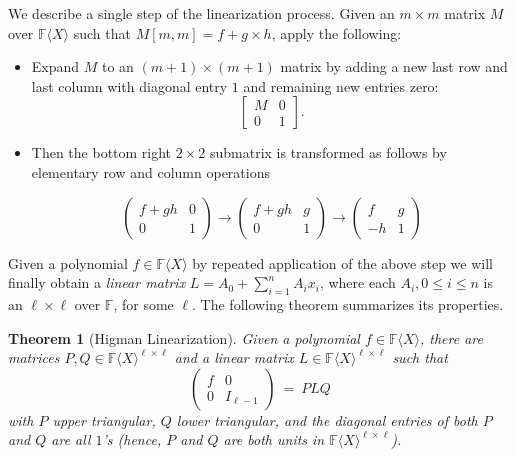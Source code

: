 \documentclass[10pt,a4paper]{article}
\newtheorem{theorem}{Theorem}[section]
\newcommand{\F}{\mathbb{F}}
\renewcommand{\angle}[1]{\langle #1 \rangle}
\newcommand{\FX}{\F\angle{X}}
\newcommand{\fR}{\FX}
\begin{document}
We describe a single step of the linearization process. Given an
$m \times m$ matrix $M$ over $\fR$ such that $M[m,m]=f+g\times h$,
apply the following:
\begin{itemize}
\item Expand $M$ to an  $(m+1)\times (m+1)$ matrix by adding a new last
  row and last column with diagonal entry $1$ and remaining new entries
  zero:
\[
\left[
\begin{array}{c|c}
M & 0 \\
\hline
0 & 1
\end{array}
\right]. 
\]
\item Then the bottom right $2\times 2$ submatrix is transformed as
  follows by elementary row and column operations

\[
\left(
\begin{array}{cc}
f+gh & 0 \\
0 & 1
\end{array}
\right)\rightarrow
\left(
\begin{array}{cc}
f+gh & g \\
0 & 1
\end{array}
\right)\rightarrow
\left(
\begin{array}{cc}
f & g \\
-h & 1
\end{array}
\right)
\]

\end{itemize}

Given a polynomial $f\in\FX$ by repeated application of the above step
we will finally obtain a \emph{linear matrix} $L=A_0+\sum_{i=1}^n A_i
x_i$, where each $A_i, 0\le i\le n$ is an $\ell\times \ell$ over $\F$,
for some $\ell$. The following theorem summarizes its properties.

\begin{theorem}[Higman Linearization]{\rm\cite{Cohnfir}}\label{higthm}
  Given a polynomial $f\in\fR$, there are matrices $P, Q\in\fR^{\ell \times \ell}$
  and a linear matrix $L\in\fR^{\ell\times \ell}$ such that
\begin{equation}\label{higeq}
%
\left(
\begin{array}{c|c}
f & 0 \\
\hline
0 & I_{\ell-1}
\end{array}
\right) ~=~PLQ
\end{equation}
with $P$ upper triangular, $Q$ lower triangular, and the diagonal
entries of both $P$ and $Q$ are all $1$'s (hence, $P$ and $Q$ are both
units in $\fR^{\ell \times \ell}$).
\end{theorem}
\end{document}
